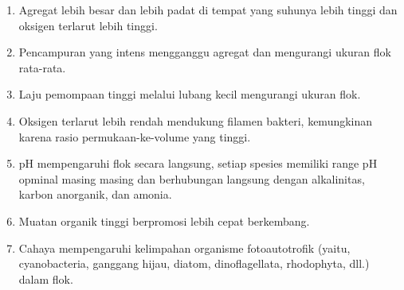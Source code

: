 \begin{enumerate}
	\item Agregat lebih besar dan lebih padat di tempat yang suhunya lebih tinggi dan oksigen terlarut lebih tinggi.
	\item Pencampuran yang intens mengganggu agregat dan mengurangi ukuran flok rata-rata.
	\item Laju pemompaan tinggi melalui lubang kecil mengurangi ukuran flok.
	\item Oksigen terlarut lebih rendah mendukung filamen bakteri, kemungkinan karena rasio permukaan-ke-volume yang tinggi.
	\item pH mempengaruhi flok secara langsung, setiap spesies memiliki range pH opminal masing masing dan berhubungan langsung dengan alkalinitas, karbon anorganik, dan amonia.
	\item Muatan organik tinggi berpromosi lebih cepat berkembang.
	\item Cahaya mempengaruhi kelimpahan organisme fotoautotrofik (yaitu, cyanobacteria, ganggang hijau, diatom, dinoflagellata, rhodophyta, dll.) dalam flok.
\end{enumerate}

